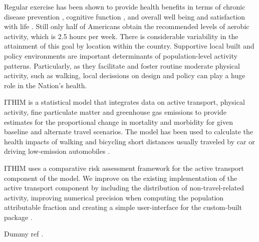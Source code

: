 Regular exercise has been shown to provide health benefits in terms of
chronic disease prevention \cite{warburton2006}, cognitive function
\cite{hillman2008}, and overall well being and satisfaction with life
\cite{maher2013}. Still only half of Americans obtain the recommended
levels of aerobic activity, which is 2.5 hours per week. There is
considerable variability in the attainment of this goal by location
within the country. Supportive local built and policy environments are
important determinants of population-level activity
patterns. Particularly, as they facilitate and foster routine moderate
physical activity, such as walking, local decissions on design and
policy can play a huge role in the Nation's health.


ITHIM is a statistical model that integrates data on active transport,
physical activity, fine particulate matter and greenhouse gas
emissions to provide estimates for the proportional change in
mortality and morbidity for given baseline and alternate travel
scenarios. The model has been used to calculate the health impacts of
walking and bicycling short distances usually traveled by car or
driving low-emission automobiles \cite{woodcock2013,maizlish2013}.

ITHIM uses a comparative risk assessment framework for the active
transport component of the model.  We improve on the existing
implementation of the active transport component by including the
distribution of non-travel-related activity, improving numerical
precision when computing the population attributable fraction and
creating a simple user-interface for the custom-built \R{}
package \package{}.

Dummy ref \cite{pucher2010}.
